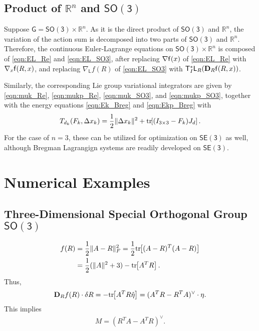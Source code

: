 \documentclass[letterpaper, 10pt, conference]{ieeeconf}
\newcommand{\bracket}[1]{\ensuremath{\left[ #1 \right]}}
\newcommand{\tr}[1]{\mbox{tr}\ensuremath{\negthickspace\bracket{#1}}}
\newcommand{\G}{\ensuremath{\mathsf{G}}}
\newcommand{\SO}{\ensuremath{\mathsf{SO(3)}}}
\newcommand{\T}{\ensuremath{\mathsf{T}}}
\renewcommand{\L}{\ensuremath{\mathsf{L}}}
\newcommand{\SE}{\ensuremath{\mathsf{SE(3)}}}
\renewcommand{\Re}{\ensuremath{\mathbb{R}}}
\newcommand{\D}{\ensuremath{\mathbf{D}}}
\begin{document}
\subsection{Product of $\Re^n$ and $\SO$}

Suppose $\G=\SO\times \Re^n$.
As it is the direct product of $\SO$ and $\Re^n$, the variation of the action sum is decomposed into two parts of $\SO$ and $\Re^n$. 
Therefore, the continuous Euler-Lagrange equations on $\SO\times\Re^n$ is composed of \eqref{eqn:EL_Re} and \eqref{eqn:EL_SO3}, after replacing $\nabla \mathsf{f}(x)$ of \eqref{eqn:EL_Re} with $\nabla_x \mathsf{f}(R,x)$, and replacing $\nabla_\L f(R)$ of \eqref{eqn:EL_SO3} with $\T^*_I\L_R(\D_R\obj(R,x))$.

Similarly, the corresponding Lie group variational integrators are given by \eqref{eqn:muk_Re}, \eqref{eqn:mukp_Re}, \eqref{eqn:muk_SO3}, and \eqref{eqn:mukp_SO3}, together with the energy equations \eqref{eqn:Ek_Breg} and \eqref{eqn:Ekp_Breg} with
\begin{align*}
    T_{d_k}(F_k,\Delta x_k) = \frac{1}{2}\|\Delta x_k\|^2 + \tr{(I_{3\times 3}-F_k)J_d}.
\end{align*}
For the case of $n=3$, these can be utilized for optimization on $\SE$ as well, although Bregman Lagrangign systems are readily developed on $\SE$.

\section{Numerical Examples}

\subsection{Three-Dimensional Special Orthogonal Group $\SO$}

\begin{align*}
    f(R) & = \frac{1}{2}\| A- R\|^2_F = \frac{1}{2} \tr{(A-R)^T(A-R)}  \\
         & =\frac{1}{2}(\|A\|^2 + 3) - \tr{A^T R}.
\end{align*}
Thus,
\begin{align*}
    \D_R f(R) \cdot \delta R = -\tr{A^T R\hat\eta} = (A^T R- R^T A)^\vee \cdot \eta.
\end{align*}
This implies
\begin{align*}
    M = (R^T A-A^T R)^\vee.
\end{align*}




\end{document}
